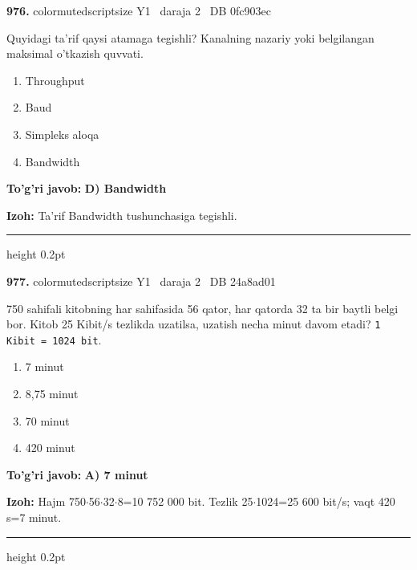 \documentclass[10pt,a4paper,oneside]{article}
\begin{document}
\noindent\textbf{\color{ink}976.}  {color{muted}scriptsize Y1 \textbullet\ daraja 2 \textbullet\ DB 0fc903ec}
\par
Quyidagi ta'rif qaysi atamaga tegishli? Kanalning nazariy yoki belgilangan maksimal o'tkazish quvvati.
\begin{enumerate}[label=\Alph*),leftmargin=9mm]
\item Throughput
\item Baud
\item Simpleks aloqa
\item Bandwidth
\end{enumerate}
\begin{tcolorbox}[enhanced,breakable,colback=teal!4,colframe=teal!50!black,boxrule=0.5pt,arc=1.1mm,left=3mm,right=3mm,top=1.7mm,bottom=1.7mm,before skip=2mm,after skip=2mm]
\textbf{\color{teal}To'g'ri javob:} \textbf{D) Bandwidth}
\par\smallskip
\textbf{Izoh:} Ta'rif Bandwidth tushunchasiga tegishli.
\end{tcolorbox}
\vspace{2mm}\hrule height 0.2pt \vspace{3mm}

\noindent\textbf{\color{ink}977.}  {color{muted}scriptsize Y1 \textbullet\ daraja 2 \textbullet\ DB 24a8ad01}
\par
750 sahifali kitobning har sahifasida 56 qator, har qatorda 32 ta bir baytli belgi bor. Kitob 25 Kibit/s tezlikda uzatilsa, uzatish necha minut davom etadi? \texttt{1 Kibit = 1024 bit}.
\begin{enumerate}[label=\Alph*),leftmargin=9mm]
\item 7 minut
\item 8,75 minut
\item 70 minut
\item 420 minut
\end{enumerate}
\begin{tcolorbox}[enhanced,breakable,colback=teal!4,colframe=teal!50!black,boxrule=0.5pt,arc=1.1mm,left=3mm,right=3mm,top=1.7mm,bottom=1.7mm,before skip=2mm,after skip=2mm]
\textbf{\color{teal}To'g'ri javob:} \textbf{A) 7 minut}
\par\smallskip
\textbf{Izoh:} Hajm 750\ensuremath{\cdot}56\ensuremath{\cdot}32\ensuremath{\cdot}8=10 752 000 bit. Tezlik 25\ensuremath{\cdot}1024=25 600 bit/s; vaqt 420 s=7 minut.
\end{tcolorbox}
\vspace{2mm}\hrule height 0.2pt \vspace{3mm}
\end{document}
